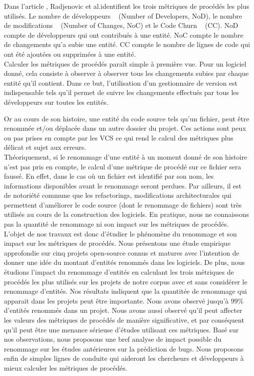 Dans l'article \cite{radjenovic_software_2013}, Radjenovic et al.identifient les trois métriques de procédés les plus utilisés. Le nombre de développeurs ~\cite{weyuker_too_2008} (Number of Developers, NoD), le nombre de modifications ~\cite{graves_predicting_2000} (Number of Changes, NoC) et le Code Churn ~\cite{munson_code_1998} (CC). NoD compte de développeurs qui ont contribués à une entité. NoC compte le nombre de changements qu'a subie une entité. CC compte le nombre de lignes de code qui ont été ajoutées ou supprimées à une entité.\\
 

Calculer les métriques de procédés paraît simple à première vue. Pour un logiciel donné, cela consiste à observer à observer tous les changements subies par chaque entité qu'il contient. Dans ce but, l'utilisation d'un gestionnaire de version est indispensable tels qu'il permet de suivre les changements effectués par tous les développeurs sur toutes les entités. 

Or au cours de son histoire, une entité du code source tels qu'un fichier, peut être renommée et/ou déplacée dans un autre dossier du projet. Ces actions sont peux ou pas prises en compte par les VCS ce qui rend le calcul des métriques plus délicat et sujet aux erreurs.\\

Théoriquement, si le renommage d'une entité à un moment donné de son histoire n'est pas pris en compte, le calcul d'une métrique de procédé sur ce fichier sera faussé. En effet, dans le cas où un fichier est identifié par son nom, les informations disponibles avant le renommage seront perdues. Par ailleurs, il est de notoriété commune que les refactorings, modifications architecturales qui permettent d'améliorer le code source (dont le renommage de fichiers) sont très utilisés au cours de la construction des logiciels. En pratique, nous ne connaissons pas la quantité de renommage ni son impact sur les métriques de procédés.\\

L’objet de nos travaux est donc d’étudier le phénomène du renommage et son impact sur les métriques de procédés. Nous présentons une étude empirique approfondie sur cinq projets open-source connus et matures avec l'intention de donner une idée du montant d'entités renommés dans les logiciels. De plus, nous étudions l'impact du renommage d'entités en calculant les trois métriques de procédés les plus utilisés sur les projets de notre corpus avec et sans considérer le renommage d'entités. Nos résultats indiquent que la quantitée de renommage qui apparait dans les projets peut être importante. Nous avons observé jusqu'à $99\%$ d'entités renommés dans un projet. Nous avons aussi observé qu'il peut affecter les valeurs des métriques de procédés de manière significative, et par conséquent qu'il peut être une menance sérieuse d'études utilisant ces métriques. Basé sur nos observations, nous proposons une bref analyse de impact possible du renommage sur les études antérieures sur la prédiction de bugs. Nous proposons enfin de simples lignes de conduite qui aideront les chercheurs et développeurs à mieux calculer les métriques de procédés.\\


